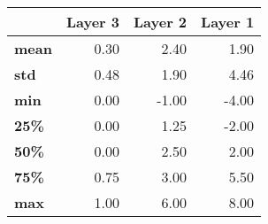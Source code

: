 \begin{tabular}{lrrr}
\toprule
{} &  Layer 3 &  Layer 2 &  Layer 1 \\
\midrule
\textbf{mean} &     0.30 &     2.40 &     1.90 \\
\textbf{std } &     0.48 &     1.90 &     4.46 \\
\textbf{min } &     0.00 &    -1.00 &    -4.00 \\
\textbf{25\% } &     0.00 &     1.25 &    -2.00 \\
\textbf{50\% } &     0.00 &     2.50 &     2.00 \\
\textbf{75\% } &     0.75 &     3.00 &     5.50 \\
\textbf{max } &     1.00 &     6.00 &     8.00 \\
\bottomrule
\end{tabular}
